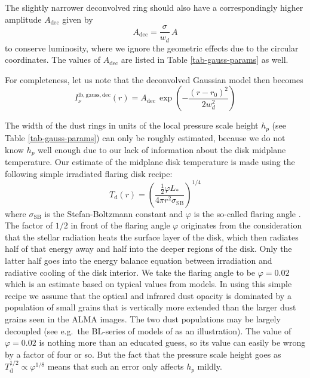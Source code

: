 \documentclass{aa}
\begin{document}
The slightly narrower deconvolved ring should also have a correspondingly
higher amplitude $A_{\mathrm{dec}}$ given by
\begin{equation}\label{eq-a-deconv}
A_{\mathrm{dec}} = \frac{\sigma}{w_d} \, A
\end{equation}
to conserve luminosity, where we ignore the geometric effects due to the
circular coordinates. The values of $A_{\mathrm{dec}}$ are listed in Table
\ref{tab-gauss-params} as well.

For completeness, let us note that the deconvolved Gaussian model then becomes
\begin{equation}\label{eq-gauss-lin-br-temp-deconv}
I_{\nu}^{\mathrm{lb,gauss,dec}}(r) = A_{\mathrm{dec}}\,\exp\left(-\frac{(r-r_0)^2}{2w_d^2}\right)
\end{equation}

The width of the dust rings in units of the local pressure scale height $h_p$
(see Table \ref{tab-gauss-params}) can only be roughly estimated, because we do
not know $h_p$ well enough due to our lack of information about the disk midplane
temperature. Our estimate of the midplane disk temperature is made using the
following simple irradiated flaring disk recipe:
\begin{equation}\label{eq-disk-temperature-model}
T_{\mathrm{d}}(r) = \left(\frac{\tfrac{1}{2}\varphi L_{*}}{4\pi r^2\sigma_{\mathrm{SB}}}\right)^{1/4}
\end{equation}
where $\sigma_{\mathrm{SB}}$ is the Stefan-Boltzmann constant and $\varphi$ is
the so-called flaring angle \citep[e.g.][]{1997ApJ...490..368C,
  1998ApJ...500..411D, 2001ApJ...560..957D}. The factor of $1/2$ in front of the
flaring angle $\varphi$ originates from the consideration that the stellar
radiation heats the surface layer of the disk, which then radiates half of that
energy away and half into the deeper regions of the disk. Only the latter half
goes into the energy balance equation between irradiation and radiative cooling
of the disk interior. We take the flaring angle to be $\varphi=0.02$ which is an
estimate based on typical values from models. In using this simple recipe we
assume that the optical and infrared dust opacity is dominated by a population
of small grains that is vertically more extended than the larger dust grains
seen in the ALMA images. The two dust populations may
be largely decoupled (see e.g.\ the BL-series of models of
\citet{2004A&A...417..159D} as an illustration). The value of $\varphi=0.02$ is
nothing more than an educated guess, so its value can easily be wrong by a
factor of four or so. But the fact that the pressure scale height goes as
$T_{\mathrm{d}}^{1/2}\propto \varphi^{1/8}$ means that such an error only
affects $h_p$ mildly.
\end{document}
